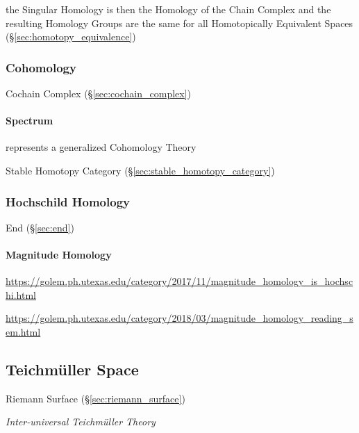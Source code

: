 the Singular Homology is then the Homology of the Chain Complex and the
resulting Homology Groups are the same for all Homotopically Equivalent Spaces
(\S\ref{sec:homotopy_equivalence})



\subsubsection{Cohomology}\label{sec:cohomology}

Cochain Complex (\S\ref{sec:cochain_complex})



\paragraph{Spectrum}\label{sec:cohomology_spectrum}\hfill

represents a generalized Cohomology Theory

Stable Homotopy Category (\S\ref{sec:stable_homotopy_category})



\subsubsection{Hochschild Homology}\label{sec:hochschild_homology}

End (\S\ref{sec:end})



\paragraph{Magnitude Homology}\label{sec:magnitude_homology}\hfill

\url{https://golem.ph.utexas.edu/category/2017/11/magnitude_homology_is_hochschi.html}

\url{https://golem.ph.utexas.edu/category/2018/03/magnitude_homology_reading_sem.html}



\subsection{Teichm\"uller Space}\label{sec:teichmuller_space}

Riemann Surface (\S\ref{sec:riemann_surface})

\emph{Inter-universal Teichm\"uller Theory} %



